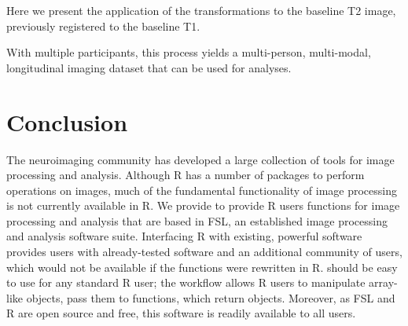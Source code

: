 Here we present the application of the transformations to the baseline T2 image, previously registered to the baseline T1.  

\begin{knitrout}
\color{fgcolor}\begin{kframe}
\begin{alltt}
\hlstd{(} \hlstd{=} \hlstd{,}
             \hlstd{=} \hlstd{(}\hlstd{(),} \hlstd{,} \hlstd{,} \hlstd{),}
             \hlstd{=} \hlstd{,}
             \hlstd{=} \hlstd{)}
\hlstd{(} \hlstd{=} \hlstd{,}
               \hlstd{=} \hlstd{(}\hlstd{(),} \hlstd{,} \hlstd{,} \hlstd{),}
               \hlstd{=} \hlstd{,}
               \hlstd{=} \hlstd{)}
\end{alltt}
\end{kframe}
\end{knitrout}

With multiple participants, this process yields a multi-person, multi-modal, longitudinal imaging dataset that can be used for analyses.





\section{Conclusion}
The neuroimaging community has developed a large collection of tools for image processing and analysis.  Although R has a number of packages to perform operations on images, much of the fundamental functionality of image processing is not currently available in R.  We provide  to provide R users functions for image processing and analysis that are based in FSL, an established image processing and analysis software suite.  Interfacing R with existing, powerful software provides users with already-tested software and an additional community of users, which would not be available if the functions were rewritten in R.   should be easy to use for any standard R user; the workflow allows R users to manipulate array-like  objects, pass them to  functions, which return  objects.  Moreover, as FSL and R are open source and free, this software is readily available to all users.  

